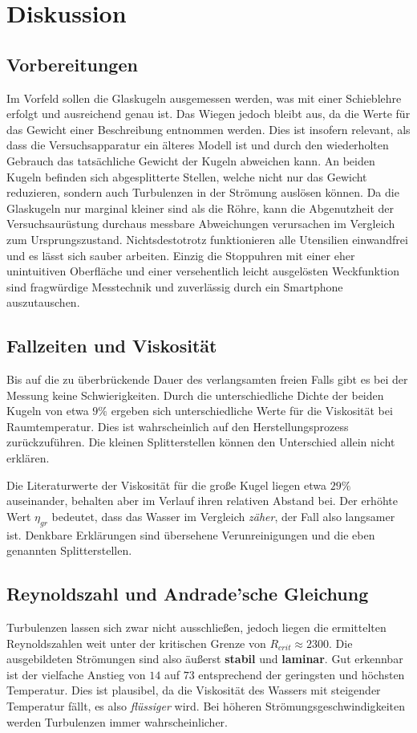 \section{Diskussion}
\label{sec:Diskussion}
\subsection{Vorbereitungen}
Im Vorfeld sollen die Glaskugeln ausgemessen werden, was mit einer Schieblehre erfolgt und ausreichend genau ist. Das Wiegen jedoch bleibt aus, da 
die Werte für das Gewicht einer Beschreibung entnommen werden. Dies ist insofern relevant, als dass die Versuchsapparatur ein älteres Modell ist
und durch den wiederholten Gebrauch das tatsächliche Gewicht der Kugeln abweichen kann. An beiden Kugeln befinden sich abgesplitterte Stellen, welche nicht nur das Gewicht reduzieren, sondern
auch Turbulenzen in der Strömung auslösen können.
Da die Glaskugeln nur marginal kleiner sind als die Röhre, kann die Abgenutzheit der Versuchsaurüstung durchaus messbare Abweichungen verursachen im Vergleich
zum Ursprungszustand.
Nichtsdestotrotz funktionieren alle Utensilien einwandfrei und es lässt sich sauber arbeiten. Einzig die Stoppuhren mit einer eher unintuitiven Oberfläche und einer
versehentlich leicht ausgelösten Weckfunktion sind fragwürdige Messtechnik und zuverlässig durch ein Smartphone auszutauschen.

\subsection{Fallzeiten und Viskosität}
Bis auf die zu überbrückende Dauer des verlangsamten freien Falls gibt es bei der Messung keine Schwierigkeiten. Durch die unterschiedliche Dichte der beiden
Kugeln von etwa $9\%$ ergeben sich unterschiedliche Werte für die Viskosität bei Raumtemperatur. Dies ist wahrscheinlich auf den Herstellungsprozess zurückzuführen.
Die kleinen Splitterstellen können den Unterschied allein nicht erklären.

Die Literaturwerte der Viskosität für die große Kugel liegen etwa $29\%$ auseinander, behalten aber im Verlauf ihren relativen Abstand bei. Der erhöhte Wert $\eta_{gr}$ bedeutet, dass das Wasser im Vergleich
\textit{zäher}, der Fall also langsamer ist. Denkbare Erklärungen sind übersehene Verunreinigungen und die eben genannten Splitterstellen.

\subsection{Reynoldszahl und Andrade'sche Gleichung}
Turbulenzen lassen sich zwar nicht ausschließen, jedoch liegen die ermittelten Reynoldszahlen weit unter der kritischen Grenze von $R_{crit} \approx 2300$.
Die ausgebildeten Strömungen sind also äußerst \textbf{stabil} und \textbf{laminar}. Gut erkennbar ist der vielfache Anstieg von $14$ auf $73$ entsprechend der geringsten und höchsten Temperatur.
Dies ist plausibel, da die Viskosität des Wassers mit steigender Temperatur fällt, es also \textit{flüssiger} wird. Bei höheren Strömungsgeschwindigkeiten werden Turbulenzen immer wahrscheinlicher.

